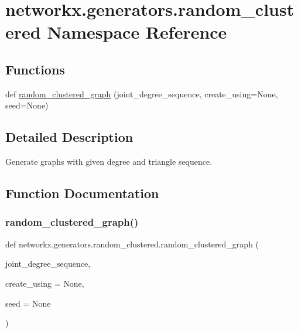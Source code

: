 \hypertarget{namespacenetworkx_1_1generators_1_1random__clustered}{}\section{networkx.\+generators.\+random\+\_\+clustered Namespace Reference}
\label{namespacenetworkx_1_1generators_1_1random__clustered}
\subsection*{Functions}
\begin{DoxyCompactItemize}
\item 
def \hyperlink{namespacenetworkx_1_1generators_1_1random__clustered_a564a2de8415f418af25bf11336769ce9}{random\+\_\+clustered\+\_\+graph} (joint\+\_\+degree\+\_\+sequence, create\+\_\+using=None, seed=None)
\end{DoxyCompactItemize}


\subsection{Detailed Description}
\begin{DoxyVerb}Generate graphs with given degree and triangle sequence.
\end{DoxyVerb}
 

\subsection{Function Documentation}
\mbox{\label{namespacenetworkx_1_1generators_1_1random__clustered_a564a2de8415f418af25bf11336769ce9}} 
\subsubsection{\texorpdfstring{random\+\_\+clustered\+\_\+graph()}{random\_clustered\_graph()}}
{\footnotesize\ttfamily def networkx.\+generators.\+random\+\_\+clustered.\+random\+\_\+clustered\+\_\+graph (\begin{DoxyParamCaption}\item[{}]{joint\+\_\+degree\+\_\+sequence,  }\item[{}]{create\+\_\+using = {\ttfamily None},  }\item[{}]{seed = {\ttfamily None} }\end{DoxyParamCaption})}

